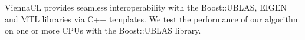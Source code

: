 \documentclass{report}
\begin{document}
ViennaCL provides seamless interoperability with the Boost::UBLAS, EIGEN and MTL libraries via C++ templates. We test the performance of our algorithm on one or more CPUs with the Boost::UBLAS library. 



%
%




\end{document}
